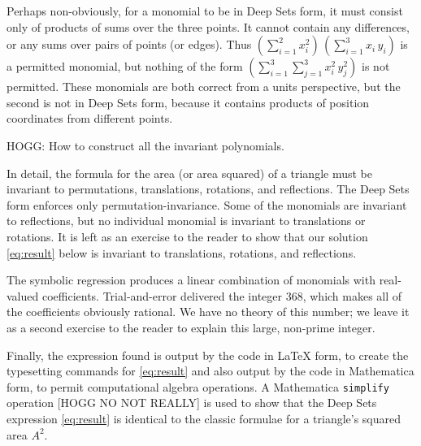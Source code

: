 \documentclass[12pt]{article}
\begin{document}
Perhaps non-obviously, for a monomial to be in Deep Sets form, it must consist only of products of sums over the three points.
It cannot contain any differences, or any sums over pairs of points (or edges).
Thus $(\sum_{i=1}^2 x_i^2)\,(\sum_{i=1}^3 x_i\,y_i)$ is a permitted monomial, but nothing of the form $(\sum_{i=1}^3\sum_{j=1}^3 x_i^2\,y_j^2)$ is not permitted.
These monomials are both correct from a units perspective, but the second is not in Deep Sets form, because it contains products of position coordinates from different points.

HOGG: How to construct all the invariant polynomials.

In detail, the formula for the area (or area squared) of a triangle must be invariant to permutations, translations, rotations, and reflections.
The Deep Sets form enforces only permutation-invariance.
Some of the monomials are invariant to reflections, but no individual monomial is invariant to translations or rotations.
It is left as an exercise to the reader to show that our solution \eqref{eq:result} below is invariant to translations, rotations, and reflections.

The symbolic regression produces a linear combination of monomials with real-valued coefficients.
Trial-and-error delivered the integer 368, which makes all of the coefficients obviously rational.
We have no theory of this number; we leave it as a second exercise to the reader to explain this large, non-prime integer.

Finally, the expression found is output by the code in LaTeX form, to create the typesetting commands for \eqref{eq:result} and also output by the code in Mathematica form, to permit computational algebra operations.
A Mathematica \texttt{simplify} operation [HOGG NO NOT REALLY] is used to show that the Deep Sets expression \eqref{eq:result} is identical to the classic formulae for a triangle's squared area $A^2$.
\end{document}
